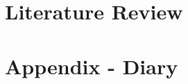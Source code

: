 \documentclass{article}
\begin{document}
\section{Literature Review}

\section{Appendix - Diary}
\end{document}
